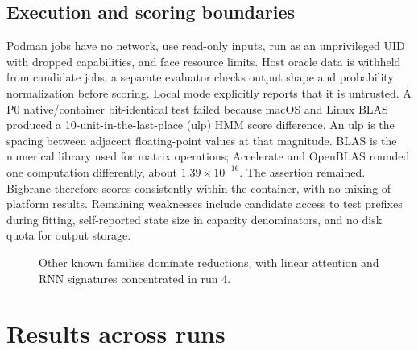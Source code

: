 \subsection{Execution and scoring boundaries}

Podman jobs have no network, use read-only inputs, run as an unprivileged UID with dropped capabilities, and face resource limits. Host oracle data is withheld from candidate jobs; a separate evaluator checks output shape and probability normalization before scoring. Local mode explicitly reports that it is untrusted. A P0 native/container bit-identical test failed because macOS and Linux BLAS produced a 10-unit-in-the-last-place (ulp) HMM score difference. An ulp is the spacing between adjacent floating-point values at that magnitude. BLAS is the numerical library used for matrix operations; Accelerate and OpenBLAS rounded one computation differently, about $1.39\times10^{-16}$. The assertion remained. Bigbrane therefore scores consistently within the container, with no mixing of platform results. Remaining weaknesses include candidate access to test prefixes during fitting, self-reported state size in capacity denominators, and no disk quota for output storage.

\begin{figure}[ht]
\centering
{}
\caption{Other known families dominate reductions, with linear attention and RNN signatures concentrated in run 4.}
\label{fig:reductions}
\end{figure}

\section{Results across runs}


